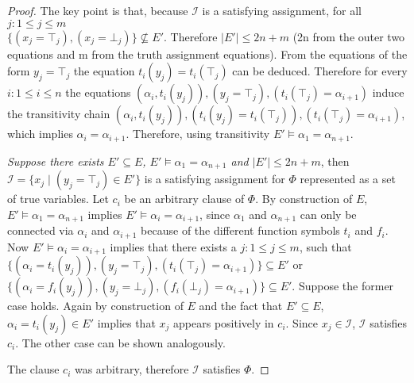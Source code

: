 \begin{proof}
The key point is that, because $\mathcal{I}$ is a satisfying assignment, for all $j: 1 \leq j \leq m$ \\ $\{(x_j = \top_j),(x_j = \bot_j)\} \nsubseteq E'$.
Therefore $|E'| \leq 2n + m$ (2n from the outer two equations and m from the truth assignment equations).
From the equations of the form $y_j = \top_j$ the equation $t_i(y_j) = t_i(\top_j)$ can be deduced.
Therefore for every $i: 1 \leq i \leq n$ the equations $(\alpha_i,t_i(y_j)),(y_j = \top_j),(t_i(\top_j) = \alpha_{i+1})$ induce the transitivity chain $(\alpha_i,t_i(y_j)),(t_i(y_j) = t_i(\top_j)),(t_i(\top_j) = \alpha_{i+1})$, which implies $\alpha_i = \alpha_{i+1}$. Therefore, using transitivity $E' \models \alpha_1 = \alpha_{n+1}$.


\emph{Suppose there exists $E' \subseteq E$, $E' \models \alpha_1 = \alpha_{n+1}$ and $|E'| \leq 2n + m$}, then $\mathcal{I} = \{x_j \mid (y_j = \top_j) \in E'\}$ is a satisfying assignment for $\Phi$ represented as a set of true variables.
Let $c_i$ be an arbitrary clause of $\Phi$.
By construction of $E$, $E' \models \alpha_1 = \alpha_{n+1}$ implies $E' \models \alpha_i = \alpha_{i+1}$, since $\alpha_1$ and $\alpha_{n+1}$ can only be connected via $\alpha_i$ and $\alpha_{i+1}$ because of the different function symbols $t_i$ and $f_i$.
Now $E' \models \alpha_i = \alpha_{i+1}$ implies that there exists a $j: 1 \leq j \leq m$, such that $\{(\alpha_i = t_i(y_j)),(y_j = \top_j),(t_i(\top_j) = \alpha_{i+1})\} \subseteq E'$ or $\{(\alpha_i = f_i(y_j)),(y_j = \bot_j),(f_i(\bot_j) = \alpha_{i+1})\} \subseteq E'$. 
Suppose the former case holds.
Again by construction of $E$ and the fact that $E' \subseteq E$, $\alpha_i = t_i(y_j) \in E'$ implies that $x_j$ appears positively in $c_i$.
Since $x_j \in \mathcal{I}$, $\mathcal{I}$ satisfies $c_i$.
The other case can be shown analogously.

The clause $c_i$ was arbitrary, therefore $\mathcal{I}$ satisfies $\Phi$.

\end{proof}